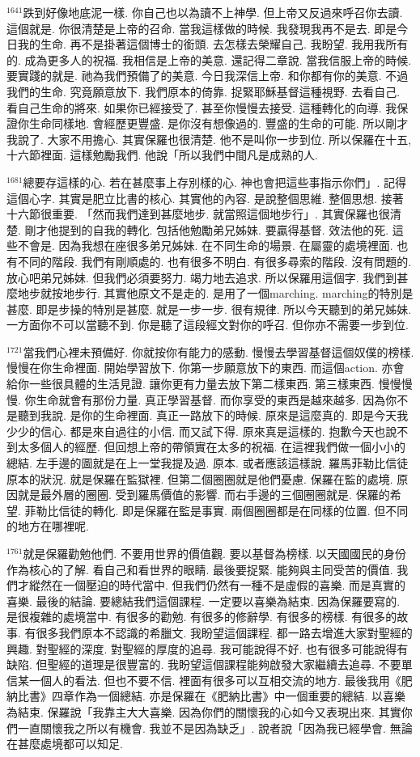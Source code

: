 \documentclass{book}
\begin{document}
$^{1641}$跌到好像地底泥一樣.
你自己也以為讀不上神學.
但上帝又反過來呼召你去讀.
這個就是.
你很清楚是上帝的召命.
當我這樣做的時候.
我發現我再不是去.
即是今日我的生命.
再不是掛著這個博士的銜頭.
去怎樣去榮耀自己.
我盼望.
我用我所有的.
成為更多人的祝福.
我相信是上帝的美意.
還記得二章說.
當我信服上帝的時候.
要實踐的就是.
祂為我們預備了的美意.
今日我深信上帝.
和你都有你的美意.
不過我們的生命.
究竟願意放下.
我們原本的倚靠.
捉緊耶穌基督這種視野.
去看自己.
看自己生命的將來.
如果你已經接受了.
甚至你慢慢去接受.
這種轉化的向導.
我保證你生命同樣地.
會經歷更豐盛.
是你沒有想像過的.
豐盛的生命的可能.
所以剛才我說了.
大家不用擔心.
其實保羅也很清楚.
他不是叫你一步到位.
所以保羅在十五,十六節裡面.
這樣勉勵我們.
他說「所以我們中間凡是成熟的人.

$^{1681}$總要存這樣的心.
若在甚麼事上存別樣的心.
神也會把這些事指示你們」.
記得這個心字.
其實是肥立比書的核心.
其實他的內容.
是說整個思維.
整個思想.
接著十六節很重要.
「然而我們達到甚麼地步.
就當照這個地步行」.
其實保羅也很清楚.
剛才他提到的自我的轉化.
包括他勉勵弟兄姊妹.
要贏得基督.
效法他的死.
這些不會是.
因為我想在座很多弟兄姊妹.
在不同生命的場景.
在屬靈的處境裡面.
也有不同的階段.
我們有剛順處的.
也有很多不明白.
有很多尋索的階段.
沒有問題的.
放心吧弟兄姊妹.
但我們必須要努力.
竭力地去追求.
所以保羅用這個字.
我們到甚麼地步就按地步行.
其實他原文不是走的.
是用了一個marching.
marching的特別是甚麼.
即是步操的特別是甚麼.
就是一步一步.
很有規律.
所以今天聽到的弟兄姊妹.
一方面你不可以當聽不到.
你是聽了這段經文對你的呼召.
但你亦不需要一步到位.

$^{1721}$當我們心裡未預備好.
你就按你有能力的感動.
慢慢去學習基督這個奴僕的榜樣.
慢慢在你生命裡面.
開始學習放下.
你第一步願意放下的東西.
而這個action.
亦會給你一些很具體的生活見證.
讓你更有力量去放下第二樣東西.
第三樣東西.
慢慢慢慢.
你生命就會有那份力量.
真正學習基督.
而你享受的東西是越來越多.
因為你不是聽到我說.
是你的生命裡面.
真正一路放下的時候.
原來是這麼真的.
即是今天我少少的信心.
都是來自過往的小信.
而又試下得.
原來真是這樣的.
抱歉今天也說不到太多個人的經歷.
但回想上帝的帶領實在太多的祝福.
在這裡我們做一個小小的總結.
左手邊的圖就是在上一堂我提及過.
原本.
或者應該這樣說.
羅馬菲勒比信徒原本的狀況.
就是保羅在監獄裡.
但第二個圈圈就是他們憂慮.
保羅在監的處境.
原因就是最外層的圈圈.
受到羅馬價值的影響.
而右手邊的三個圈圈就是.
保羅的希望.
菲勒比信徒的轉化.
即是保羅在監是事實.
兩個圈圈都是在同樣的位置.
但不同的地方在哪裡呢.

$^{1761}$就是保羅勸勉他們.
不要用世界的價值觀.
要以基督為榜樣.
以天國國民的身份作為核心的了解.
看自己和看世界的眼睛.
最後要捉緊.
能夠與主同受苦的價值.
我們才縱然在一個壓迫的時代當中.
但我們仍然有一種不是虛假的喜樂.
而是真實的喜樂.
最後的結論.
要總結我們這個課程.
一定要以喜樂為結束.
因為保羅要寫的.
是很複雜的處境當中.
有很多的勸勉.
有很多的修辭學.
有很多的榜樣.
有很多的故事.
有很多我們原本不認識的希臘文.
我盼望這個課程.
都一路去增進大家對聖經的興趣.
對聖經的深度.
對聖經的厚度的追尋.
我可能說得不好.
也有很多可能說得有缺陷.
但聖經的道理是很豐富的.
我盼望這個課程能夠啟發大家繼續去追尋.
不要單信某一個人的看法.
但也不要不信.
裡面有很多可以互相交流的地方.
最後我用《肥納比書》四章作為一個總結.
亦是保羅在《肥納比書》中一個重要的總結.
以喜樂為結束.
保羅說「我靠主大大喜樂.
因為你們的關懷我的心如今又表現出來.
其實你們一直關懷我之所以有機會.
我並不是因為缺乏」.
說者說「因為我已經學會.
無論在甚麼處境都可以知足.
\end{document}
